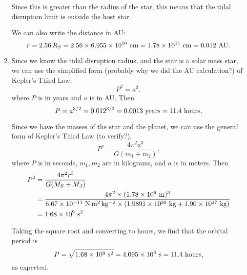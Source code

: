 \documentclass[11pt,letterpaper]{article}
\begin{document}
\begin{enumerate}[label=(\alph*)]
        Since this is greater than the radius of the star, this means that the tidal disruption limit is outside the host star.

        We can also write the distance in AU:
        \begin{equation*}
            r = 2.56\,R_S = 2.56\times 6.955\times 10^{10}~{\rm cm} = 1.78\times 10^{11}~{\rm cm} = 0.012~{\rm AU}.
        \end{equation*}

    \item Since we know the tidal disruption radius, and the star is a solar mass star, we can use the simplified form (probably why we did the AU calculation?) of Kepler's Third Law:
        \begin{equation*}
            P^2 = a^3,
        \end{equation*}
        where $P$ is in years and $a$ is in AU. Then 
        \begin{equation*}
            P= a^{3/2} = 0.012^{3/2} = 0.0013~{\rm years} = 11.4~{\rm hours}.
        \end{equation*}

        Since we have the masses of the star and the planet, we can use the general form of Kepler's Third Law (to verify?),
        \begin{equation*}
            P^2 = \frac{4\pi^2 a^3}{G(m_1+m_2)},
        \end{equation*}
        where $P$ is in seconds, $m_1, m_2$ are in kilograms, and $a$ is in meters. Then
        \begin{align*}
            P^2 &= \frac{4\pi^2 r^3}{G(M_S+M_J)} \\
                            &= \frac{4\pi^2\times (1.78\times 10^{9}~{\rm m})^3}{6.67\times 10^{-11}~{\rm N\,m^2\,kg^{-2}} \times (1.9891\times 10^{30}~{\rm kg} + 1.90\times 10^{27}~{\rm kg})} \\
                              &= 1.68\times 10^{9}~{\rm s}^2.
        \end{align*}

        Taking the square root and converting to hours, we find that the orbital period is
        \begin{equation*}
            P = \sqrt{1.68\times 10^{9}~{\rm s}^2} = 4.095\times 10^{4}~{\rm s} = 11.4~{\rm hours},
        \end{equation*}
        as expected.


\end{enumerate}
\end{document}
